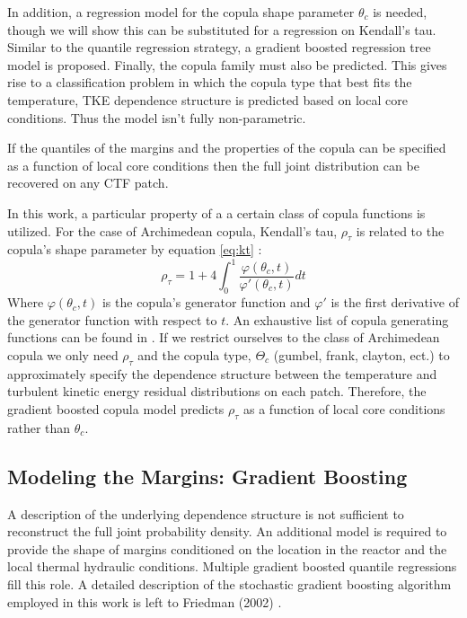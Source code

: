 In addition, a regression model for the copula shape parameter $\theta_c$ is needed, though we will show this can be substituted for a regression on Kendall's tau.  Similar to the quantile regression strategy, a gradient boosted regression tree model is proposed.  Finally, the copula family must also be predicted.  This gives rise to a classification problem in which the copula type that best fits the temperature, TKE dependence structure is predicted based on local core conditions.  Thus the model isn't fully non-parametric.

If the quantiles of the margins and the properties of the copula can be specified as a function of local core conditions then the full joint distribution can be recovered on any CTF patch.

In this work, a particular property of a a certain class of copula functions is utilized.
For the case of Archimedean copula, Kendall's tau, $\rho_\tau$ is
related to the copula's shape parameter by equation \ref{eq:kt} \cite{Nelsen2006}:
\begin{equation}
\rho_\tau = 1 + 4 \int_0^1 \frac{\varphi(\theta_c,t)}{\varphi'(\theta_c, t)}dt
\label{eq:kt}
\end{equation}
Where $\varphi(\theta_c, t)$ is the copula's generator function and $\varphi'$ is the first derivative of the generator function with respect to $t$.  An exhaustive list of copula generating functions can be found in \cite{Nelsen2006}.
If we restrict ourselves to the class of Archimedean copula we only need $\rho_\tau$ and the copula type, $\Theta_c$ (gumbel, frank, clayton, ect.) to approximately specify the dependence structure between the temperature and turbulent kinetic energy residual distributions on each patch.  Therefore, the gradient boosted copula model predicts $\rho_\tau$ as a function of local core conditions rather than $\theta_c$.

\subsection{Modeling the Margins: Gradient Boosting}

A description of the underlying dependence structure is not sufficient to reconstruct the full joint probability density.  An additional model is required to provide the shape of margins conditioned on the location in the reactor and the local thermal hydraulic conditions.  Multiple gradient boosted quantile regressions fill this role.  A detailed description of the stochastic gradient boosting algorithm employed in this work is left to Friedman (2002) \cite{friedman2002}.  

